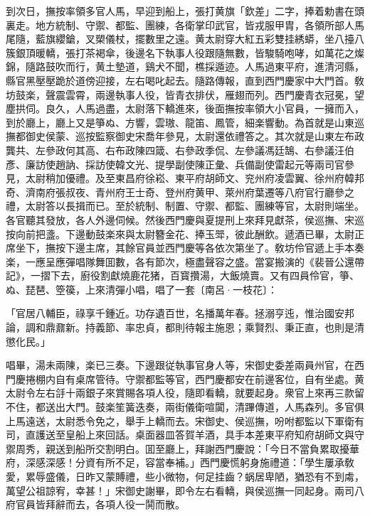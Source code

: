 到次日，撫按率領多官人馬，早迎到船上，張打黄旗「欽差」二字，捧着勅書在頭裏走。地方統制、守禦、都監、團練，各衛掌印武官，皆戎服甲胄，各領所部人馬尾隨，藍旗纓鎗，叉槊儀杖，擺數里之遠。黄太尉穿大紅五彩雙挂綉蟒，坐八擡八簇銀頂暖轎，張打茶褐傘，後邊名下執事人役跟隨無數，皆駿騎咆哮，如萬花之燦錦，隨路鼓吹而行，黄土墊道，鷄犬不聞，樵採遁迹。人馬過東平府，進清河縣，縣官黑壓壓跪於道傍迎接，左右喝叱起去。隨路傳報，直到西門慶家中大門首。敎坊鼓楽，聲震雲霄，兩邊執事人役，皆青衣排伏，雁翅而列。西門慶青衣冠冕，望塵拱伺。良久，人馬過盡，太尉落下轎進來，後面撫按率領大小官員，一擁而入，到於廳上，廳上又是箏ぬ、方響，雲璈、龍笛、鳳管，細楽響動。為首就是山東巡撫都御史侯蒙、巡按監察御史宋喬年參見，太尉還依禮答之。其次就是山東左布政龔共、左參政何其高、右布政陳四箴、右參政季侃、左參議馮廷鵠、右參議汪伯彥、廉訪使趙訥、採訪使韓文光、提學副使陳正彙、兵備副使雷起元等兩司官參見，太尉稍加優禮。及至東昌府徐崧、東平府胡師文、兖州府凌雲翼、徐州府韓邦奇、濟南府張叔夜、青州府王士奇、登州府黄甲、萊州府葉遷等八府官行廳參之禮，太尉答以長揖而已。至於統制、制置、守禦、都監、團練等官，太尉則端坐。各官聽其發放，各人外邊伺候。然後西門慶與夏提刑上來拜見獻茶，侯巡撫、宋巡按向前把盞。下邊動鼓楽來與太尉簪金花、捧玉斝，彼此酬飲。遞酒已畢，太尉正席坐下，撫按下邊主席，其餘官員並西門慶等各依次第坐了。敎坊伶官遞上手本奏楽，一應呈應彈唱隊舞囬數，各有節次，極盡聲容之盛。當宴搬演的《裴晉公還帶記》，一摺下去，廚役割獻燒鹿花猪，百寳攢湯，大飯燒賣。又有四員伶官，箏、ぬ、琵琶、箜篌，上來清彈小唱，唱了一套〔南呂·一枝花〕：

\begin{myquote}
「官居八輔臣，祿享千鍾近。功存遺百世，名播萬年春。拯溺亨迍，惟治國安邦論，調和鼎鼐新。持義節、率忠貞，都則待報主施恩；乘賢烈、秉正直，也則是清懲化民。」
\end{myquote}

唱畢，湯未兩陳，楽已三奏。下邊跟従執事官身人等，宋御史委差兩員州官，在西門慶捲棚内自有桌席管待。守禦都監等官，西門慶都安在前邊客位，自有坐處。黄太尉令左右㧱十兩銀子來賞賜各項人役，隨即看轎，就要起身。衆官上來再三款留不住，都送出大門。鼓楽笙簧迭奏，兩街儀衛喧闐，清蹕傳道，人馬森列。多官俱上馬遠送，太尉悉令免之，舉手上轎而去。宋御史、侯巡撫，吩咐都監以下軍衛有司，直護送至皇船上來回話。桌面器皿答賀羊酒，具手本差東平府知府胡師文與守禦周秀，親送到船所交割明白。囬至廳上，拜謝西門慶說：「今日不當負累取擾華府，深感深感！分資有所不足，容當奉補。」西門慶慌躬身施禮道：「學生屢承敎愛，累辱盛儀，日昨又蒙賻禮，些小微物，何足挂齒？蜗居卑陋，猶恐有不到䖏，萬望公祖諒宥，幸甚！」宋御史謝畢，即令左右看轎，與侯巡撫一同起身。兩司八府官員皆拜辭而去，各項人役一鬨而散。

